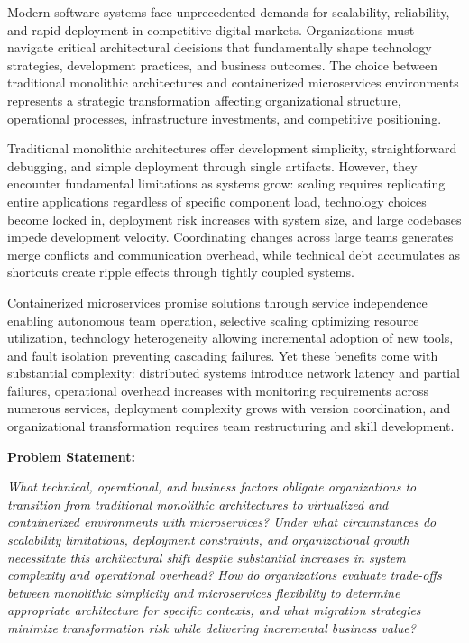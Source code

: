 \documentclass[a4paper, 12pt]{report}
\begin{document}
Modern software systems face unprecedented demands for scalability, reliability, and rapid deployment in competitive digital markets. Organizations must navigate critical architectural decisions that fundamentally shape technology strategies, development practices, and business outcomes. The choice between traditional monolithic architectures and containerized microservices environments represents a strategic transformation affecting organizational structure, operational processes, infrastructure investments, and competitive positioning.

Traditional monolithic architectures offer development simplicity, straightforward debugging, and simple deployment through single artifacts. However, they encounter fundamental limitations as systems grow: scaling requires replicating entire applications regardless of specific component load, technology choices become locked in, deployment risk increases with system size, and large codebases impede development velocity. Coordinating changes across large teams generates merge conflicts and communication overhead, while technical debt accumulates as shortcuts create ripple effects through tightly coupled systems.

Containerized microservices promise solutions through service independence enabling autonomous team operation, selective scaling optimizing resource utilization, technology heterogeneity allowing incremental adoption of new tools, and fault isolation preventing cascading failures. Yet these benefits come with substantial complexity: distributed systems introduce network latency and partial failures, operational overhead increases with monitoring requirements across numerous services, deployment complexity grows with version coordination, and organizational transformation requires team restructuring and skill development.

\textbf{Problem Statement:}

\emph{What technical, operational, and business factors obligate organizations to transition from traditional monolithic architectures to virtualized and containerized environments with microservices? Under what circumstances do scalability limitations, deployment constraints, and organizational growth necessitate this architectural shift despite substantial increases in system complexity and operational overhead? How do organizations evaluate trade-offs between monolithic simplicity and microservices flexibility to determine appropriate architecture for specific contexts, and what migration strategies minimize transformation risk while delivering incremental business value?}
\\
 
\end{document}
